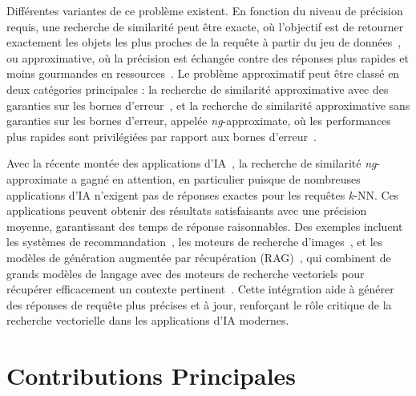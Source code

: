 Différentes variantes de ce problème existent. En fonction du niveau de précision requis, une recherche de similarité peut être exacte, où l'objectif est de retourner exactement les objets les plus proches de la requête à partir du jeu de données~\cite{hercules,hydra1,conf/icde/echihabi2021,messi,parisplus,dumpy,dpisax,kdtree,dstree,isax2+,ulisse,vafile,twinsubsequences,oddysey,dstree}, ou approximative, où la précision est échangée contre des réponses plus rapides et moins gourmandes en ressources~\cite{hydra2,hercules,qalsh,kdtree,kgraph,efanna,hnsw,dpg,conf/icassp/jegou2011,journal/iccv/xia2013,journal/pami/babenko15,hnsw,hcnng,nsg,vamana}. Le problème approximatif peut être classé en deux catégories principales : la recherche de similarité approximative avec des garanties sur les bornes d'erreur~\cite{conf/vldb/lv2007,sk-lsh,journal/pvldb/zheng2020,journal/pvldb/zhu2016,conf/stoc/indyk1998,conf/vldb/sun14,qalsh,hydra2,srs,conf/sigmod/gogolou20}, et la recherche de similarité approximative sans garanties sur les bornes d'erreur, appelée \textit{ng}-approximate, où les performances plus rapides sont privilégiées par rapport aux bornes d'erreur~\cite{kdtree,hydra2,elpis,hercules,hnsw,nsg,hcnng,efanna,nsg,nssg,nsw11,vamana,ieh,dpg,kgraph}.

Avec la récente montée des applications d'IA~\cite{rag0, nsg,alibabaknngml, recommender_systems,faiss,amazon}, la recherche de similarité \textit{ng}-approximate a gagné en attention, en particulier puisque de nombreuses applications d'IA n'exigent pas de réponses exactes pour les requêtes \textit{k}-NN. Ces applications peuvent obtenir des résultats satisfaisants avec une précision moyenne, garantissant des temps de réponse raisonnables. Des exemples incluent les systèmes de recommandation~\cite{conf/kdd/wang2018,amazon,nsg}, les moteurs de recherche d'images~\cite{nsg,faiss}, et les modèles de génération augmentée par récupération (RAG)~\cite{retrieval-diffusion-models,dense-passage-retrieval,seq2seq,rag-nlp}, qui combinent de grands modèles de langage avec des moteurs de recherche vectoriels pour récupérer efficacement un contexte pertinent~\cite{retrieval-diffusion-models,rag-nlp,rag0,rag1,rag2,rag3}. Cette intégration aide à générer des réponses de requête plus précises et à jour, renforçant le rôle critique de la recherche vectorielle dans les applications d'IA modernes.

\section*{Contributions Principales}

